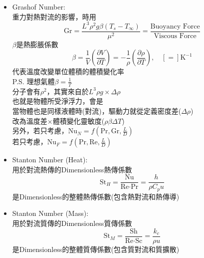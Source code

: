 \documentclass[../main.tex]{subfiles}
\begin{document}
\begin{itemize}
\begin{itemize}
    \begin{equation}
      \boxed{\text{Pe}_M = \text{Re}\cdot\text{Sc} = \frac{\rho u D}{D_{AB}} 
      = \frac{\rho \vec{\bm u}\cdot \nabla C_A}{D_{AB}\nabla^2 C_A}
      = \frac{\text{Mass Convection Rate}}{\text{Mass Diffusion Rate}}}
    \end{equation}
    若$\text{Pe}_M$很大($10^4$以上)，代表軸向上的質量擴散可以被忽略
  \item Grashof Number:\\
    重力對熱對流的影響，時用
    \begin{equation}
      \text{Gr} = \frac{L^3\rho^2g\beta\left(T_s-T_\infty\right)}{\mu^2} 
      = \frac{\text{Buoyancy Force}}{\text{Viscous Force}} \label{eq:grashof_number}
    \end{equation}
    $\beta$是熱膨脹係數
    \begin{equation}
      \boxed{\beta = \frac{1}{V}\left(
        \frac{\partial V}{\partial T}
      \right)
      = -\frac{1}{\rho}\left(
        \frac{\partial \rho}{\partial T}
      \right)}, \quad [=] \mathrm{K^{-1}}
    \end{equation}
    代表溫度改變單位體積的體積變化率\\
    P.S. 理想氣體$\beta = \frac{1}{T}$\\
    分子會有$\rho^2$，其實來自於$L^3 \rho g \times \Delta \rho$\\
    也就是物體所受淨浮力，會是\\
    當物體也是同樣液體時(對流)，驅動力就從定義密度差($\Delta \rho$)\\
    改為溫度差$\times$體積變化靈敏度($\rho \beta \Delta T$)\\
    另外，若只考慮，$\text{Nu}_N = f(\text{Pr},\text{Gr},\frac{L}{D})$\\
    若只考慮，$\text{Nu}_F = f(\text{Pr},\text{Re},\frac{L}{D})$
  \item Stanton Number (Heat):\\
    用於對流熱傳的Dimensionless熱傳係數
    \begin{equation}
      \text{St}_H = \frac{\text{Nu}}{\text{Re}\cdot\text{Pr}} = \frac{h}{\rho C_p u}
    \end{equation}
    是Dimensionless的整體熱傳係數(包含熱對流和熱傳導)
  \item Stanton Number (Mass):\\
    用於對流質傳的Dimensionless質傳係數
    \begin{equation}
      \text{St}_M = \frac{\text{Sh}}{\text{Re}\cdot\text{Sc}} = \frac{k_c}{\rho u}
    \end{equation}
    是Dimensionless的整體質傳係數(包含質對流和質擴散)
  \end{itemize}
\end{itemize}
\end{document}
